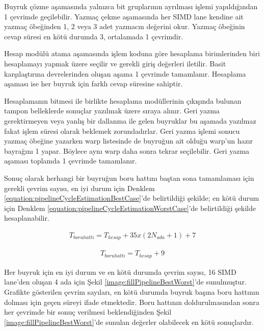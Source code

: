 Buyruk çözme aşamasında yalnızca bit gruplarının ayrılması işlemi yapıldığından 1 çevrimde geçilebilir. Yazmaç çekme aşamasında her SIMD lane kendine ait yazmaç öbeğinden 1, 2 veya 3 adet yazmacın değerini okur. Yazmaç öbeğinin cevap süresi en kötü durumda 3, ortalamada 1 çevrimdir.\par
Hesap modülü atama aşamasında işlem koduna göre hesaplama birimlerinden biri hesaplamayı yapmak üzere seçilir ve gerekli giriş değerleri iletilir. Basit karşılaştırma devrelerinden oluşan aşama 1 çevrimde tamamlanır. Hesaplama aşaması ise her buyruk için farklı cevap süresine sahiptir. \par
Hesaplamanın bitmesi ile birlikte hesaplama modüllerinin çıkışında bulunan tampon belleklerde sonuçlar yazılmak üzere sıraya alınır. Geri yazma gerektirmeyen veya yanlış bir dallanma ile gelen buyruklar bu aşamada yazılmaz fakat işlem süresi olarak beklemek zorundadırlar. Geri yazma işlemi sonucu yazmaç öbeğine yazarken warp listesinde de buyruğun ait olduğu warp'un hazır bayrağını 1 yapar. Böylece aynı warp daha sonra tekrar seçilebilir. Geri yazma aşaması toplamda 1 çevrimde tamamlanır.\par

Sonuç olarak herhangi bir buyruğun boru hattını baştan sona tamamlaması için gerekli çevrim sayısı, en iyi durum için Denklem \ref{equation:pipelineCycleEstimationBestCase}'de belirtildiği şekilde; en kötü durum için Denklem \ref{equation:pipelineCycleEstimationWorstCase}'de belirtildiği şekilde hesaplanabilir.\par

\begin{align} \label{equation:pipelineCycleEstimationWorstCase}
	T_{boru hatti} 	= T_{hesap} + 35 x (2N_{ada}+1) + 7
\end{align}

\begin{align} \label{equation:pipelineCycleEstimationBestCase}
	T_{boru hattı}  =  T_{hesap} + 9
\end{align}

Her buyruk için en iyi durum ve en kötü durumda çevrim sayısı, 16 SIMD lane'den oluşan 4 ada için Şekil \ref{image:fillPipelineBestWorst}'de sunulmuştur. Grafikte gösterilen çevrim sayıları, en kötü durumda buyruk başına boru hattının dolması için geçen süreyi ifade etmektedir. Boru hattının doldurulmasından sonra her çevrimde bir sonuç verilmesi beklendiğinden Şekil \ref{image:fillPipelineBestWorst}'de sunulan değerler olabilecek en kötü sonuçlardır.\par

